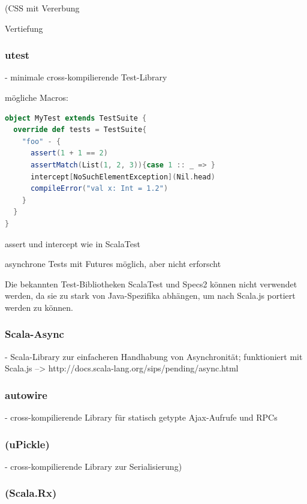 \documentclass[a4paper, 12pt, hidelinks, listof=totoc, listoftables=totoc, bibliography=totoc]{scrreprt}
\begin{document}
(CSS mit Vererbung

Vertiefung


\subsubsection{utest}

- minimale cross-kompilierende Test-Library

mögliche Macros:
\begin{lstlisting}[language=Scala]
object MyTest extends TestSuite {
  override def tests = TestSuite{
    "foo" - {
      assert(1 + 1 == 2)
      assertMatch(List(1, 2, 3)){case 1 :: _ => }
      intercept[NoSuchElementException](Nil.head)
      compileError("val x: Int = 1.2")
    }
  }
}
\end{lstlisting}

assert und intercept wie in ScalaTest


asynchrone Tests mit Futures möglich, aber nicht erforscht

Die bekannten Test-Bibliotheken ScalaTest und Specs2 können nicht verwendet werden, da sie zu stark von Java-Spezifika abhängen, um nach Scala.js portiert werden zu können\cite[\#OtherTestingLibraries]{haoyi.HOS}.


\subsubsection{Scala-Async}

- Scala-Library zur einfacheren Handhabung von Asynchronität; funktioniert mit Scala.js -->  http://docs.scala-lang.org/sips/pending/async.html

\subsubsection{autowire}

- cross-kompilierende Library für statisch getypte Ajax-Aufrufe und RPCs

\subsubsection{(uPickle)}

- cross-kompilierende Library zur Serialisierung)

\subsubsection{(Scala.Rx)}
\end{document}
